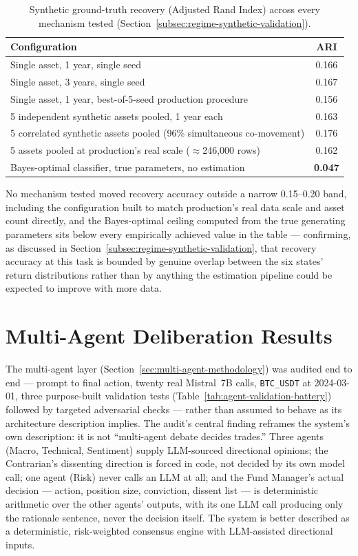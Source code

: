 \begin{table}[H]
\centering
\small
\caption{Synthetic ground-truth recovery (Adjusted Rand Index) across every mechanism tested (Section~\ref{subsec:regime-synthetic-validation}).}
\label{tab:regime-synthetic-results}
\begin{tabular}{|l|c|}
\hline
\textbf{Configuration} & \textbf{ARI} \\
\hline
Single asset, 1 year, single seed & 0.166 \\
\hline
Single asset, 3 years, single seed & 0.167 \\
\hline
Single asset, 1 year, best-of-5-seed production procedure & 0.156 \\
\hline
5 independent synthetic assets pooled, 1 year each & 0.163 \\
\hline
5 correlated synthetic assets pooled (96\% simultaneous co-movement) & 0.176 \\
\hline
5 assets pooled at production's real scale ($\approx$246{,}000 rows) & 0.162 \\
\hline
\hline
Bayes-optimal classifier, true parameters, no estimation & \textbf{0.047} \\
\hline
\end{tabular}
\normalsize
\end{table}

No mechanism tested moved recovery accuracy outside a narrow 0.15--0.20 band, including the configuration built to match production's real data scale and asset count directly, and the Bayes-optimal ceiling computed from the true generating parameters sits below every empirically achieved value in the table --- confirming, as discussed in Section~\ref{subsec:regime-synthetic-validation}, that recovery accuracy at this task is bounded by genuine overlap between the six states' return distributions rather than by anything the estimation pipeline could be expected to improve with more data.

\section{Multi-Agent Deliberation Results}
\label{sec:agent-results}

The multi-agent layer (Section~\ref{sec:multi-agent-methodology}) was audited end to end --- prompt to final action, twenty real Mistral~7B calls, \texttt{BTC\_USDT} at 2024-03-01, three purpose-built validation tests (Table~\ref{tab:agent-validation-battery}) followed by targeted adversarial checks --- rather than assumed to behave as its architecture description implies. The audit's central finding reframes the system's own description: it is not ``multi-agent debate decides trades.'' Three agents (Macro, Technical, Sentiment) supply LLM-sourced directional opinions; the Contrarian's dissenting direction is forced in code, not decided by its own model call; one agent (Risk) never calls an LLM at all; and the Fund Manager's actual decision --- action, position size, conviction, dissent list --- is deterministic arithmetic over the other agents' outputs, with its one LLM call producing only the rationale sentence, never the decision itself. The system is better described as a deterministic, risk-weighted consensus engine with LLM-assisted directional inputs.

